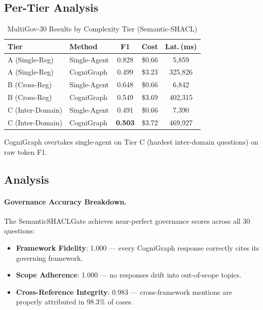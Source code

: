 \documentclass[a4paper,11pt]{article}
\theoremstyle{definition}
\begin{document}
\subsection{Per-Tier Analysis}

\begin{table}[ht]
\centering
\caption{MultiGov-30 Results by Complexity Tier (Semantic-SHACL)}
\label{tab:tier_results}
\begin{tabular}{llccc}
\toprule
\textbf{Tier} & \textbf{Method} & \textbf{F1} & \textbf{Cost} & \textbf{Lat.\,(ms)} \\
\midrule
A (Single-Reg) & Single-Agent & 0.828 & \$0.66 & 5,859 \\
A (Single-Reg) & CogniGraph & 0.499 & \$3.23 & 325,826 \\
\midrule
B (Cross-Reg) & Single-Agent & 0.648 & \$0.66 & 6,842 \\
B (Cross-Reg) & CogniGraph & 0.549 & \$3.69 & 402,315 \\
\midrule
C (Inter-Domain) & Single-Agent & 0.491 & \$0.66 & 7,390 \\
C (Inter-Domain) & CogniGraph & \textbf{0.503} & \$3.72 & 469,927 \\
\bottomrule
\end{tabular}

\smallskip
{\footnotesize CogniGraph overtakes single-agent on Tier C (hardest inter-domain questions) on raw token F1.}
\end{table}

\subsection{Analysis}

\paragraph{Governance Accuracy Breakdown.}
The SemanticSHACLGate achieves near-perfect governance scores across all 30 questions:
\begin{itemize}
\item \textbf{Framework Fidelity}: 1.000 --- every CogniGraph response correctly cites its governing framework.
\item \textbf{Scope Adherence}: 1.000 --- no responses drift into out-of-scope topics.
\item \textbf{Cross-Reference Integrity}: 0.983 --- cross-framework mentions are properly attributed in 98.3\% of cases.
\end{itemize}
\end{document}
